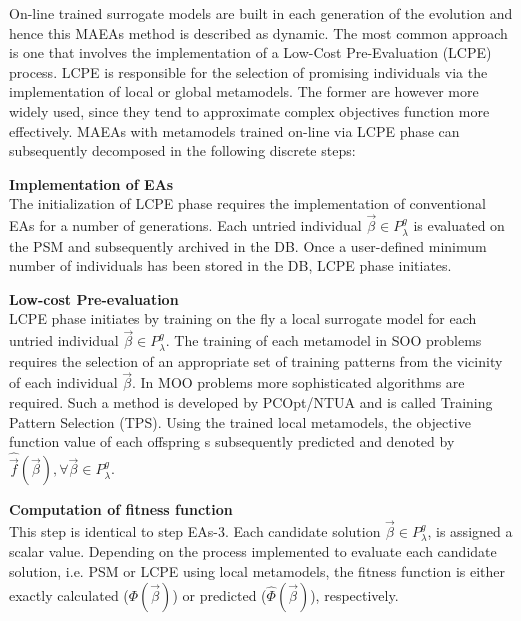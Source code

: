 On-line trained surrogate models are built in each 
generation of the evolution and hence this MAEAs method is 
described as dynamic. The most common approach is one 
that involves the implementation of a Low-Cost 
Pre-Evaluation (LCPE) process. LCPE is responsible for 
the selection of promising individuals via the 
implementation of local or global metamodels. The former 
are however more widely used, since they tend to 
approximate complex objectives function more effectively. 
MAEAs with metamodels trained on-line via LCPE phase can
subsequently decomposed in the following discrete steps:   
 
\begin{ONL}
\item \textbf{Implementation of EAs} \\
The initialization of LCPE phase requires the 
implementation of conventional EAs for a number of 
generations. Each untried individual $\vec{β} \!\in \!P_{λ}^{g}$ is 
evaluated on the PSM and subsequently archived in 
the DB. Once a user-defined minimum number of individuals 
has been stored in the DB, LCPE\cite{LCPE} phase initiates.

\item \textbf{Low-cost Pre-evaluation} \\
LCPE phase initiates by training on the fly a local 
surrogate model for each untried individual $\vec{β} \in 
P_{λ}^{g}$. The training of each metamodel in SOO problems 
requires the selection of an appropriate set of training 
patterns from the vicinity of each individual $\vec{β}$. 
In MOO problems more sophisticated algorithms 
are required. Such a method is developed by PCOpt/NTUA and is 
called Training Pattern Selection (TPS)\cite{TPS}. Using 
the trained local metamodels, the objective function value 
of each offspring s subsequently predicted and denoted by 
$\hat{\vec{f}}(\vec{β}), \forall \vec{β}\in P_{λ}^{g}$.

\item \textbf{Computation of fitness function} \\
This step is identical to step EAs-3. Each candidate 
solution $\vec{β} \!\in \!P_{λ}^{g}$,  is assigned a scalar 
value. Depending on the process implemented to evaluate 
each candidate solution, i.e. PSM or LCPE using local 
metamodels, the fitness function is either exactly 
calculated ($Φ(\vec{β})$) or predicted ($\widehat{Φ}
(\vec{β})$), respectively.


\end{ONL}
